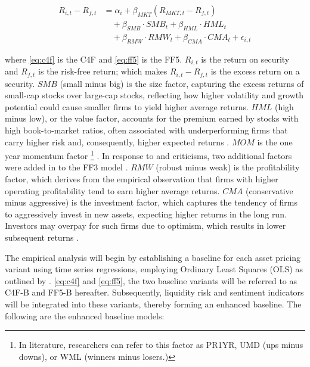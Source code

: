 \begin{equation}
    \label{eq:ff5}
    \begin{split}
        R_{i,t} - R_{f,t} &= \alpha_i + \beta_{MKT} (R_{MKT,t} - R_{f,t}) \\
        &\quad + \beta_{SMB} \cdot SMB_t + \beta_{HML} \cdot HML_t \\
        &\quad + \beta_{RMW} \cdot RMW_t + \beta_{CMA} \cdot CMA_t + \epsilon_{i,t}
    \end{split}
\end{equation}

where \cref{eq:c4f} is the C4F and \cref{eq:ff5} is the FF5. $R_{i,t}$ is the return on security and $R_{f,t}$ is the risk-free return; which makes $R_{i,t} - R_{f,t}$ is the excess return on a security. $SMB$ (small minus big) is the size factor, capturing the excess returns of small-cap stocks over large-cap stocks, reflecting how higher volatility and growth potential could cause smaller firms to yield higher average returns. $HML$ (high minus low), or the value factor, accounts for the premium earned by stocks with high book-to-market ratios, often associated with underperforming firms that carry higher risk and, consequently, higher expected returns \cite{ff3_1993}. $MOM$ is the one year momentum factor \footnote{In literature, researchers can refer to this factor as PR1YR, UMD (ups minus downs), or WML (winners minus losers.)} \cite{cahart_1997}. In response to  and  criticisms, two additional factors were added in to the FF3 model \cite{ff5_2015}. $RMW$ (robust minus weak) is the profitability factor, which derives from the empirical observation that firms with higher operating profitability tend to earn higher average returns. $CMA$ (conservative minus aggressive) is the investment factor, which captures the tendency of firms to aggressively invest in new assets, expecting higher returns in the long run. Investors may overpay for such firms due to optimism, which results in lower subsequent returns \cite{titman_2004}.

The empirical analysis will begin by establishing a baseline for each asset pricing variant using time series regressions, employing Ordinary Least Squares (OLS) as outlined by . \cref{eq:c4f} and \cref{eq:ff5}, the two baseline variants will be referred to as C4F-B and FF5-B hereafter. Subsequently, liquidity risk and sentiment indicators will be integrated into these variants, thereby forming an enhanced baseline. The following are the enhanced baseline models:

